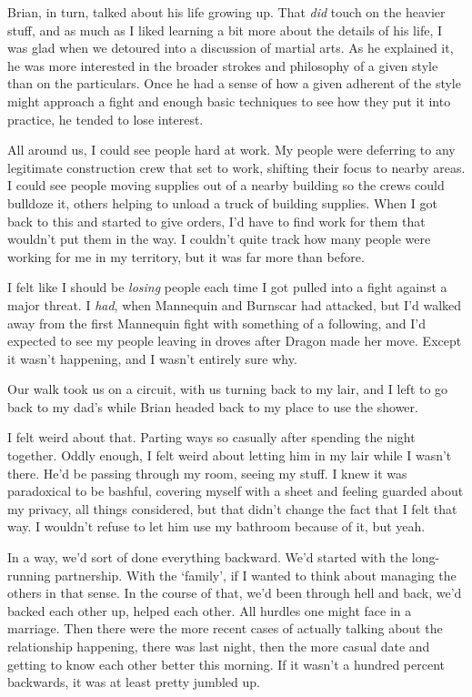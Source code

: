 Brian, in turn, talked about his life growing up.  That \emph{did} touch on the heavier stuff, and as much as I liked learning a bit more about the details of his life, I was glad when we detoured into a discussion of martial arts.  As he explained it, he was more interested in the broader strokes and philosophy of a given style than on the particulars.  Once he had a sense of how a given adherent of the style might approach a fight and enough basic techniques to see how they put it into practice, he tended to lose interest.



All around us, I could see people hard at work.  My people were deferring to any legitimate construction crew that set to work, shifting their focus to nearby areas.  I could see people moving supplies out of a nearby building so the crews could bulldoze it, others helping to unload a truck of building supplies.  When I got back to this and started to give orders, I'd have to find work for them that wouldn't put them in the way.  I couldn't quite track how many people were working for me in my territory, but it was far more than before.



I felt like I should be \emph{losing} people each time I got pulled into a fight against a major threat.  I \emph{had}, when Mannequin and Burnscar had attacked, but I'd walked away from the first Mannequin fight with something of a following, and I'd expected to see my people leaving in droves after Dragon made her move.  Except it wasn't happening, and I wasn't entirely sure why.



Our walk took us on a circuit, with us turning back to my lair, and I left to go back to my dad's while Brian headed back to my place to use the shower.



I felt weird about that.  Parting ways so casually after spending the night together.  Oddly enough, I felt weird about letting him in my lair while I wasn't there.  He'd be passing through my room, seeing my stuff.  I knew it was paradoxical to be bashful, covering myself with a sheet and feeling guarded about my privacy, all things considered, but that didn't change the fact that I felt that way.  I wouldn't refuse to let him use my bathroom because of it, but yeah.



In a way, we'd sort of done everything backward.  We'd started with the long-running partnership.  With the `family', if I wanted to think about managing the others in that sense. In the course of that, we'd been through hell and back, we'd backed each other up, helped each other.  All hurdles one might face in a marriage.  Then there were the more recent cases of actually talking about the relationship happening, there was last night, then the more casual date and getting to know each other better this morning.  If it wasn't a hundred percent backwards, it was at least pretty jumbled up.




